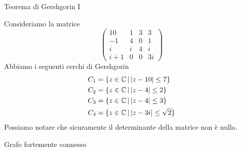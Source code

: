 \documentclass[a4paper]{article}
\begin{document}
\begin{radioactive}
    \begin{snippetexample}{Teorema di Gershgorin I}
        \begin{figure}
            \begin{center}
            \end{center}
            \vspace{-3cm}
        \end{figure}
        Consideriamo la matrice
        \[
            \begin{pmatrix}
                10 & 1 & 3 & 3 \\
                -1 & 4 & 0 & 1 \\
                i & i & 4 & i \\
                i+1 & 0 & 0 & 3i
            \end{pmatrix}
        \]
        Abbiamo i seguenti cerchi di Gershgorin
        \begin{align*}
            C_1 &= \{ z \in \mathbb{C} \,|\, |z-10| \leq 7\} \\
            C_2 &= \{ z \in \mathbb{C} \,|\, |z-4| \leq 2\} \\
            C_3 &= \{ z \in \mathbb{C} \,|\, |z-4| \leq 3\} \\
            C_4 &= \{ z \in \mathbb{C} \,|\, |z-3i| \leq \sqrt{2}\}
        \end{align*}
        Possiamo notare che sicuramente il determinante della matrice non è nullo.
        \wrapfill
    \end{snippetexample}
\end{radioactive}

\pagebreak

\begin{snippetdefinition}{Grafo fortemente connesso}
    \todo
\end{snippetdefinition}
\end{document}
